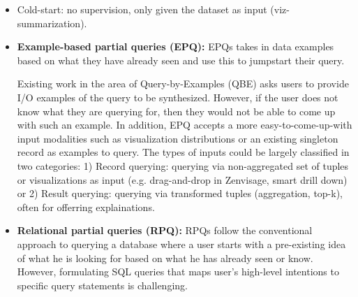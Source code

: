 \documentclass{sig-alternate-05-2015}
\begin{document}
\begin{itemize}
\item Cold-start: no supervision, only given the dataset as input (viz-summarization).
\item \textbf{Example-based partial queries (EPQ):} EPQs takes in data examples based on what they have already seen and use this to jumpstart their query. 
\par Existing work in the area of Query-by-Examples (QBE) asks users to provide I/O examples of the query to be synthesized. However, if the user does not know what they are querying for, then they would not be able to come up with such an example. In addition, EPQ accepts a more easy-to-come-up-with input modalities such as visualization distributions or an existing singleton record as examples to query. The types of inputs could be largely classified in two categories: 1) Record querying: querying via non-aggregated set of tuples or visualizations as input (e.g. drag-and-drop in Zenvisage, smart drill down) or 2) Result querying: querying via transformed tuples (aggregation, top-k), often for offerring explainations\cite{Chapman2009,Wu2013,Roy2015}.
\item \textbf{Relational partial queries (RPQ):} RPQs follow the conventional approach to querying a database where a user starts with a pre-existing idea of what he is looking for based on what he has already seen or know. However, formulating SQL queries that maps user's high-level intentions to specific query statements is challenging. 

\end{itemize}
\end{document}
